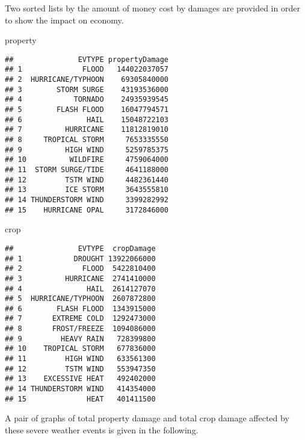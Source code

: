 \documentclass[]{article}
\newenvironment{Shaded}{\begin{snugshade}}{\end{snugshade}}
\newcommand{\NormalTok}[1]{#1}
\begin{document}
Two sorted lists by the amount of money cost by damages are provided in
order to show the impact on economy.

\begin{Shaded}
\begin{Highlighting}[]
\NormalTok{property}
\end{Highlighting}
\end{Shaded}

\begin{verbatim}
##               EVTYPE propertyDamage
## 1              FLOOD   144022037057
## 2  HURRICANE/TYPHOON    69305840000
## 3        STORM SURGE    43193536000
## 4            TORNADO    24935939545
## 5        FLASH FLOOD    16047794571
## 6               HAIL    15048722103
## 7          HURRICANE    11812819010
## 8     TROPICAL STORM     7653335550
## 9          HIGH WIND     5259785375
## 10          WILDFIRE     4759064000
## 11  STORM SURGE/TIDE     4641188000
## 12         TSTM WIND     4482361440
## 13         ICE STORM     3643555810
## 14 THUNDERSTORM WIND     3399282992
## 15    HURRICANE OPAL     3172846000
\end{verbatim}

\begin{Shaded}
\begin{Highlighting}[]
\NormalTok{crop}
\end{Highlighting}
\end{Shaded}

\begin{verbatim}
##               EVTYPE  cropDamage
## 1            DROUGHT 13922066000
## 2              FLOOD  5422810400
## 3          HURRICANE  2741410000
## 4               HAIL  2614127070
## 5  HURRICANE/TYPHOON  2607872800
## 6        FLASH FLOOD  1343915000
## 7       EXTREME COLD  1292473000
## 8       FROST/FREEZE  1094086000
## 9         HEAVY RAIN   728399800
## 10    TROPICAL STORM   677836000
## 11         HIGH WIND   633561300
## 12         TSTM WIND   553947350
## 13    EXCESSIVE HEAT   492402000
## 14 THUNDERSTORM WIND   414354000
## 15              HEAT   401411500
\end{verbatim}

A pair of graphs of total property damage and total crop damage affected
by these severe weather events is given in the following.
\end{document}
